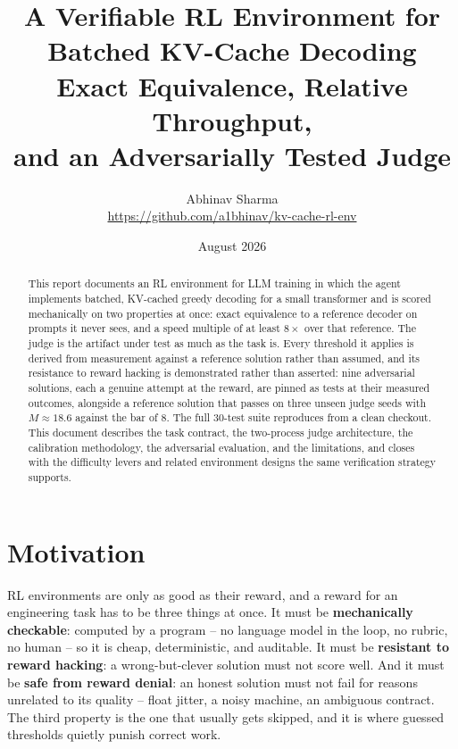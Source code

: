 \documentclass[11pt]{article}
\title{\textbf{A Verifiable RL Environment for\\Batched KV-Cache Decoding}\\[4pt]
\large Exact Equivalence, Relative Throughput,\\and an Adversarially Tested Judge}
\author{Abhinav Sharma\\[2pt]
\small\url{https://github.com/a1bhinav/kv-cache-rl-env}}
\date{August 2026}
\begin{document}
\maketitle
\vspace{-2.2em}

\begin{abstract}
\noindent This report documents an RL environment for LLM training in which the agent
implements batched, KV-cached greedy decoding for a small transformer and is scored
mechanically on two properties at once: exact equivalence to a reference decoder on
prompts it never sees, and a speed multiple of at least $8\times$ over that reference.
The judge is the artifact under test as much as the task is. Every threshold it applies
is derived from measurement against a reference solution rather than assumed, and its
resistance to reward hacking is demonstrated rather than asserted: nine adversarial
solutions, each a genuine attempt at the reward, are pinned as tests at their measured
outcomes, alongside a reference solution that passes on three unseen judge seeds with
$M \approx 18.6$ against the bar of 8. The full 30-test suite reproduces from a clean
checkout. This document describes the task contract, the two-process judge
architecture, the calibration methodology, the adversarial evaluation, and the
limitations, and closes with the difficulty levers and related environment designs the
same verification strategy supports.
\end{abstract}

\tableofcontents
\vspace{0.8em}

\section{Motivation}

RL environments are only as good as their reward, and a reward for an engineering task
has to be three things at once. It must be \textbf{mechanically checkable}: computed by
a program -- no language model in the loop, no rubric, no human -- so it is cheap,
deterministic, and auditable. It must be \textbf{resistant to reward hacking}: a
wrong-but-clever solution must not score well. And it must be \textbf{safe from reward
denial}: an honest solution must not fail for reasons unrelated to its quality --
float jitter, a noisy machine, an ambiguous contract. The third property is the one
that usually gets skipped, and it is where guessed thresholds quietly punish correct
work.
\end{document}
